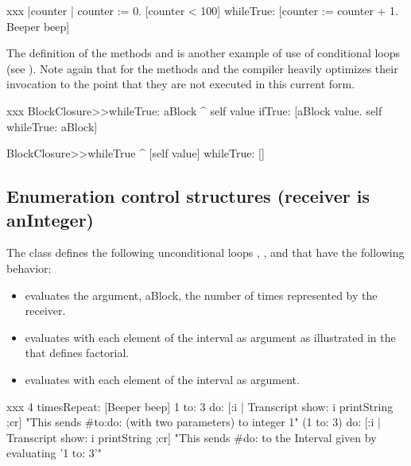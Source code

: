 \documentclass[a4paper,10pt,twoside]{book}
\begin{document}
\begin{script}[xxx]{xxx}
|counter |
counter := 0.
[counter < 100] whileTrue: 
    [counter := counter + 1. 
    Beeper beep]
\end{script}

The definition of the methods  and  is another example of use of conditional loops (see ). Note again that for the methods  and  the compiler heavily optimizes their  invocation to the point that they are not executed in this current form. 

\begin{method}[xxx]{xxx}
BlockClosure>>whileTrue: aBlock
   ^ self value 
        ifTrue:	
           [aBlock value. 
         	  self whileTrue: aBlock]

BlockClosure>>whileTrue
   ^ [self value] whileTrue: [] 
\end{method}

\subsection{Enumeration control structures (receiver is anInteger)}
The class  defines the following  unconditional loops , 
 , and   that have the following 
behavior: 

\begin{itemize}
\item {} evaluates the argument, aBlock, the number of times represented by the receiver.
\item {} evaluates  with each element of the interval  as argument as illustrated in the  that defines factorial.
\item {}	evaluates  with each element of the interval  as argument.
\end{itemize}

\begin{script}[xxx]{xxx}
4 timesRepeat: [Beeper beep]
1 to: 3 do: [:i | Transcript show: i printString ;cr] 
"This sends #to:do: (with two parameters) to integer 1"
(1 to: 3) do:  [:i | Transcript show: i printString ;cr] 
"This sends #do: to the Interval given by evaluating '1 to: 3'"
\end{script}
\end{document}
